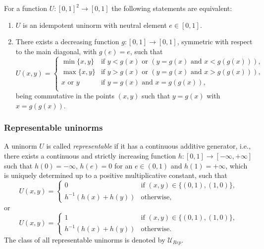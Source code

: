 \begin{theorem}
	For a function $U : [0,1]^2 \to [0,1]$ the following statements are equivalent:
	\begin{enumerate}[label=(\roman*)]
		\item $U$ is an idempotent uninorm with neutral element $e \in [0,1]$.
		\item There exists a decreasing function $g: [0,1] \to [0,1]$, symmetric with respect to the main diagonal, with $g(e)=e$, such that
		\begin{equation}\label{eq:uidempotent}
			U(x,y)
			=
			\left\{\begin{array}{ll}
				\min\{x,y\} & \text{if } y<g(x) \text{ or } (y=g(x) \text{ and } x<g(g(x))), \\
				\max\{x,y\} & \text{if } y>g(x) \text{ or } (y=g(x) \text{ and } x>g(g(x))), \\
				x \text{ or } y & \text{if } y=g(x) \text{ and } x=g(g(x)), \\
			\end{array}
			\right.
		\end{equation}
	being commutative in the points $(x,y)$ such that $y=g(x)$ with $x=g(g(x))$.
	\end{enumerate}
\end{theorem}


\subsubsection{Representable uninorms}

\begin{definition}
	A uninorm $U$ is called \emph{representable} if it has a continuous additive generator, i.e., there exists a continuous and strictly increasing function $h:[0,1] \to [-\infty,+\infty]$ such that $h(0)=-\infty$, $h(e)=0$ for an $e \in (0,1)$ and $h(1)=+\infty$, which is uniquely determined up to a positive multiplicative constant, such that
	$$U(x,y)
	=
	\left\{\begin{array}{ll}
		0 & \text{if } (x,y) \in \{(0,1),(1,0)\}, \\
		h^{-1}(h(x)+h(y)) & \text{otherwise},
	\end{array}
	\right.
	$$
	or 
	$$U(x,y)
	=
	\left\{\begin{array}{ll}
		1 & \text{if } (x,y) \in \{(0,1),(1,0)\}, \\
		h^{-1}(h(x)+h(y)) & \text{otherwise}.
	\end{array}
	\right.
	$$
	The class of all representable uninorms is denoted by  $\mathcal{U}_{Rep}$.
\end{definition}

